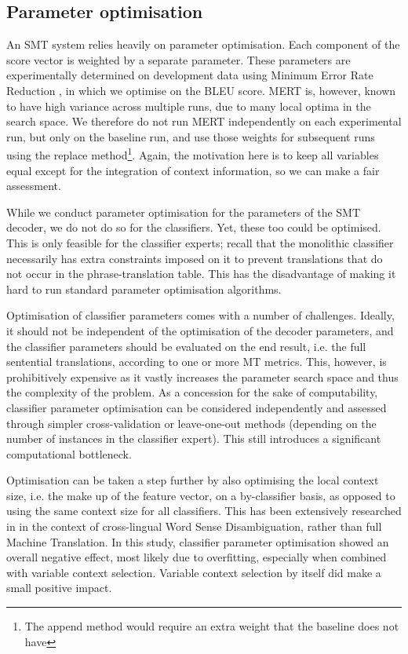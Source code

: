 \documentclass[smallextended]{svjour3}       %
\theoremstyle{break}
\begin{document}
\subsection{Parameter optimisation}
\label{sec:paropt}

An SMT system relies heavily on parameter optimisation. Each component of the
score vector is weighted by a separate parameter. These parameters are
experimentally determined on development data using Minimum Error Rate
Reduction \citep{MERT}, in which we optimise on the BLEU score. MERT is,
however, known to have high variance across multiple runs, due to many local
optima in the search space. We therefore do not run MERT independently on each
experimental run, but only on the baseline run, and use those weights for
subsequent runs using the replace method\footnote{The append method would
require an extra weight that the baseline does not have}. Again, the motivation
here is to keep all variables equal except for the integration of context
information, so we can make a fair assessment.

While we conduct parameter optimisation for the parameters of the SMT
decoder, we do not do so for the classifiers. Yet, these too could
be optimised. This is only feasible for the classifier experts; recall
that the monolithic classifier necessarily has extra constraints
imposed on it to prevent translations that do not occur in the
phrase-translation table. This has the disadvantage of making it hard
to run standard parameter optimisation algorithms.

Optimisation of classifier parameters comes with a number of challenges.
Ideally, it should not be independent of the optimisation of the decoder
parameters, and the classifier parameters should be evaluated on the
end result, i.e. the full sentential translations, according to one or more MT
metrics. This, however, is prohibitively expensive as it vastly increases the
parameter search space and thus the complexity of the problem. As a concession
for the sake of computability, classifier parameter optimisation can be considered
independently and assessed through simpler cross-validation or leave-one-out
methods (depending on the number of instances in the classifier expert).  This
still introduces a significant computational bottleneck.  

Optimisation can be taken a step further by also optimising the local context
size, i.e. the make up of the feature vector, on a by-classifier basis, as
opposed to using the same context size for all classifiers. This has been
extensively researched in \cite{WSD2} in the context of cross-lingual Word
Sense Disambiguation, rather than full Machine Translation. In this study,
classifier parameter optimisation showed an overall negative effect, most
likely due to overfitting, especially when combined with variable context
selection. Variable context selection by itself did make a small positive
impact.
\end{document}
